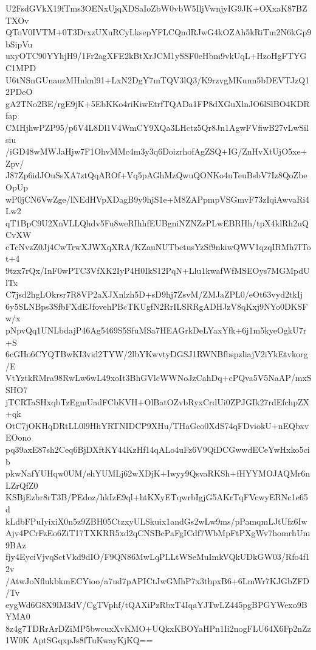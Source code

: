 U2FsdGVkX19fTms3OENxUjqXDSaIoZbW0vbW5IljVwnjyIG9JK+OXxaK87BZTXOv
QToV0IVTM+0T3DrxzUXuRCyLksepYFLCQndRJwG4kOZAh5kRiTm2N6kGp9bSipVu
uxyOTC90YYhjH9/1Fr2agXFE2kBtXrJCM1ySSF0eHbm9vkUqL+HzoHgFTYGC1MPD
U6tNSnGUnauzMHnknl91+LxN2DgY7mTQV3lQ3/K9rzvgMKunn5bDEVTJzQ12PDeO
gA2TNo2BE/rgE9jK+5EbKKo4riKiwEtrfTQADa1FP8dXGuXlnJO6lSlBO4KDRfap
CMHjhwPZP95/p6V4L8Dl1V4WmCY9XQa3LHctz5Qr8Jn1AgwFVfiwB27vLwSilsiu
/iGD48wMWJaHjw7F1OhvMMc4m3y3q6DoizrhofAgZSQ+IG/ZnHvXtUjO5xe+Zpv/
J87Zp6idJOuSsXA7ztQqAROf+Vq5pAGhMzQwuQONKo4uTeuBsbV7Iz8QoZbeOpUp
wP0jCN6VwZge/lNEdHVpXDagB9y9hjS1e+M8ZAPpmpVSGmvF73zIqiAwvaRi4Lw2
qT1BpC9U2XnVLLQhdv5Fu8weRIhhfEUBgniNZNZzPLwEBRHh/tpX4klRh2uQCvXW
cTcNvzZ0Jj4CwTrwXJWXqXRA/KZauNUTbctusYzSf9nkiwQWV1qzqIRMh7ITot+4
9tzx7rQx/InF0wPTC3VfXK2IyP4H0IkS12PqN+Llu1kwafWfMSEOys7MGMpdUlTx
C7jsd2hgLOkrsr7R8VP2aXJXnlzh5D+sD9hj7ZsvM/ZMJaZPL0/eOt63vyd2tkIj
6y5SLNBps3SfbFXdEJfovehPBcTKUgfN2RrILSRRgADHJzV8qKxj9NYo0DKSFw/x
pNpvQq1UNLbdajP46Ag5469S5SfuMSa7HEAGrkDeLYaxYfk+6j1m5kyeOgkU7r+S
6cGHo6CYQTBwKI3vid2TYW/2lbYKwvtyDGSJ1RWNBfbspzliajV2iYkEtvkorg/E
VtYztkRMra98RwLw6wL49xoIt3BhGVlcWWNoJzCahDq+cPQva5V5NaAP/mxSSHO7
jTCRTaSHxqbTzEgmUadFCbKVH+OlBatOZvbRyxCrdUi0ZPJGIk27rdEfchpZX+qk
OtC7jOKHqDRtLL0l9HhYRTNIDCP9XHu/THaGco0XdS74qFDviokU+nEQbxvEOono
pq39axE87sh2Ceq6BjDXftKY44KzHf14qALo4uFz6V9QiDCGwwdECeYwHxko5cib
pkwNafYUHqw0UM/ehYUMLj62wXDjK+Iwyy9QsvaRKSh+fHYYMOJAQMr6nLZrQfZ0
KSBjEzbr8rT3B/PEdoz/hkIzE9ql+htKXyETqwrbIgjG5AKrTqFVcwyERNc1e65d
kLdbFPuIyixiX0n5z9ZBH05CtzxyULSkuix1andGs2wLw9ms/pPamqmLJtUfz6Iw
Ajv4PCrFzEo6ZiT17TXKRR5xd2qCNSBcPaFgICdf7WbMpFtPXgWv7homrhUm9BAz
fjy4EyciVjvqSctVkd9dIO/F9QN86MwLqPLLtWSeMuImkVQkUDkGW03/Rfo4f12v
/AtwJoNflukbkmECYioo/a7ud7pAPICtJwGMhP7x3thpxB6+6LmWr7KJGbZFD/Tv
eygWd6G8X9lM3dV/CgTVphf/tQAXiPzRbxT4IqaYJTwLZ445pgBPGYWexo9BYMA0
8z4g7TDRrArDZiMP5bwcuxXvKMO+UQkxKBOYaHPn1Ii2nogFLU64X6Fp2nZz1W0K
AptSGqxpJs8fTuKwayKjKQ==
